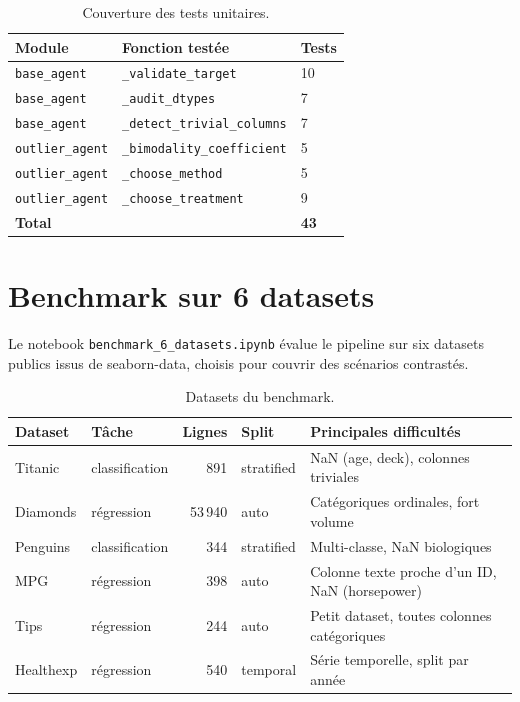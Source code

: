 \documentclass[12pt,a4paper]{article}
\begin{document}
\begin{table}[H]
\centering
\begin{tabular}{lll}
\toprule
\textbf{Module} & \textbf{Fonction testée} & \textbf{Tests} \\
\midrule
\texttt{base\_agent} & \texttt{\_validate\_target} & 10 \\
\texttt{base\_agent} & \texttt{\_audit\_dtypes} & 7 \\
\texttt{base\_agent} & \texttt{\_detect\_trivial\_columns} & 7 \\
\texttt{outlier\_agent} & \texttt{\_bimodality\_coefficient} & 5 \\
\texttt{outlier\_agent} & \texttt{\_choose\_method} & 5 \\
\texttt{outlier\_agent} & \texttt{\_choose\_treatment} & 9 \\
\midrule
\multicolumn{2}{l}{\textbf{Total}} & \textbf{43} \\
\bottomrule
\end{tabular}
\caption{Couverture des tests unitaires.}
\end{table}

\section{Benchmark sur 6 datasets}

Le notebook \texttt{benchmark\_6\_datasets.ipynb} évalue le pipeline sur six datasets
publics issus de seaborn-data, choisis pour couvrir des scénarios contrastés.

\begin{table}[H]
\centering
\small
\begin{tabular}{llrlp{5cm}}
\toprule
\textbf{Dataset} & \textbf{Tâche} & \textbf{Lignes} & \textbf{Split} & \textbf{Principales difficultés} \\
\midrule
Titanic & classification & 891 & stratified & NaN (age, deck), colonnes triviales \\
Diamonds & régression & 53\,940 & auto & Catégoriques ordinales, fort volume \\
Penguins & classification & 344 & stratified & Multi-classe, NaN biologiques \\
MPG & régression & 398 & auto & Colonne texte proche d'un ID, NaN (horsepower) \\
Tips & régression & 244 & auto & Petit dataset, toutes colonnes catégoriques \\
Healthexp & régression & 540 & temporal & Série temporelle, split par année \\
\bottomrule
\end{tabular}
\caption{Datasets du benchmark.}
\end{table}
\end{document}

